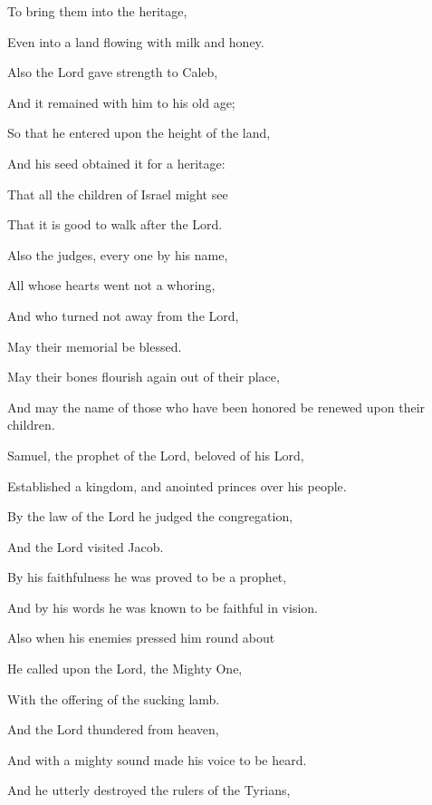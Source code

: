 {\par }{\Q To bring them into the heritage,
\par }{\Q Even into a land flowing with milk and honey.
\par }{\Q {}Also the Lord gave strength to Caleb,
\par }{\Q And it remained with him to his old age;
\par }{\Q So that he entered upon the height of the land,
\par }{\Q And his seed obtained it for a heritage:
\par }{\Q {}That all the children of Israel might see
\par }{\Q That it is good to walk after the Lord.
\par }{\BB \par }{\Q {}Also the judges, every one by his name,
\par }{\Q All whose hearts went not a whoring,
\par }{\Q And who turned not away from the Lord,
\par }{\Q May their memorial be blessed.
\par }{\Q {}May their bones flourish again out of their place,
\par }{\Q And may the name of those who have been honored be renewed upon their children.
\par }{\BB \par }{\Q {}Samuel, the prophet of the Lord, beloved of his Lord,
\par }{\Q Established a kingdom, and anointed princes over his people.
\par }{\Q {}By the law of the Lord he judged the congregation,
\par }{\Q And the Lord visited Jacob.
\par }{\Q {}By his faithfulness he was proved to be a prophet,
\par }{\Q And by his words he was known to be faithful in vision.
\par }{\Q {}Also when his enemies pressed him round about
\par }{\Q He called upon the Lord, the Mighty One,
\par }{\Q With the offering of the sucking lamb.
\par }{\Q {}And the Lord thundered from heaven,
\par }{\Q And with a mighty sound made his voice to be heard.
\par }{\Q {}And he utterly destroyed the rulers of the Tyrians,
}
